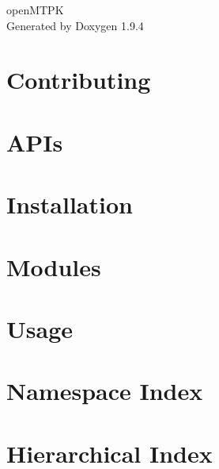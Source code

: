 \documentclass[twoside]{book}
\newcommand{\+}{\discretionary{\mbox{\scriptsize$\hookleftarrow$}}{}{}}
\newcommand{\clearemptydoublepage}{%
    \newpage{\pagestyle{empty}\cleardoublepage}%
  }
\begin{document}
  \raggedbottom
    \hypersetup{pageanchor=false,
                bookmarksnumbered=true,
                pdfencoding=unicode
               }
  \begin{titlepage}
  \vspace*{7cm}
  \begin{center}%
  {\Large open\+MTPK}\\
  \vspace*{1cm}
  {\large Generated by Doxygen 1.9.4}\\
  \end{center}
  \end{titlepage}
  \clearemptydoublepage
  \tableofcontents
  \clearemptydoublepage
  \hypersetup{pageanchor=true}
\chapter{Contributing}
\label{md_docs_CONTRIBUTING}

\chapter{APIs}
\label{md_docs_source_APIs}

\chapter{Installation}
\label{md_docs_source_Installation}

\chapter{Modules}
\label{md_docs_source_Modules}

\chapter{Usage}
\label{md_docs_source_Usage}

\chapter{Namespace Index}

\chapter{Hierarchical Index}

\end{document}
